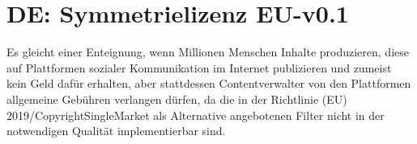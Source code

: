 \documentclass[a4paper,8pt]{extarticle}
\begin{document}
\pagebreak
\setlength{\parskip}{0.5\baselineskip}


\section{DE: Symmetrielizenz EU-v0.1}
\label{DE}

Es gleicht einer Enteignung, wenn Millionen Menschen Inhalte produzieren, diese auf Plattformen sozialer Kommunikation im Internet publizieren und zumeist kein Geld dafür erhalten, aber stattdessen Contentverwalter von den Plattformen allgemeine Gebühren verlangen dürfen, da die in der Richtlinie (EU) 2019/CopyrightSingleMarket als Alternative angebotenen Filter nicht in der notwendigen Qualität implementierbar sind.
\end{document}
